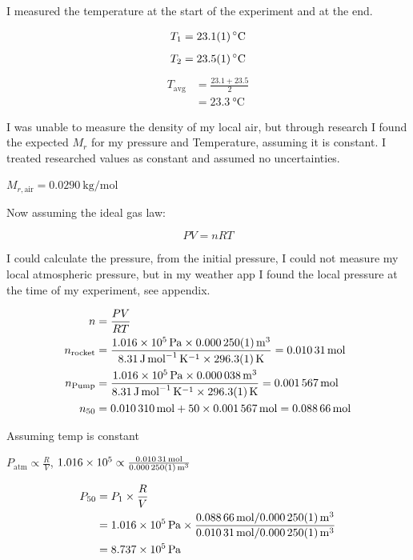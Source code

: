 \documentclass[12pt,a4paper]{article}
\begin{document}
I measured the temperature at the start of the experiment and at the end.

\begin{align}
T_1 &= \SI{23.1 \pm 0.1}{\celsius} \\
\end{align}
\begin{align}
T_2 &= \SI{23.5 \pm 0.1}{\celsius} \\
\end{align}
\begin{align} T_{\text{avg}} &= \frac{23.1 + 23.5}{2} \\
&= \SI{23.3}{\celsius}
\end{align}

I was unable to measure the density of my local air, but through research \cite{ref14} I found the expected $M_r$ for my pressure and Temperature, assuming it is constant. I treated researched values as constant and assumed no uncertainties.

$M_{r,\text{air}} = \SI{0.0290}{\kilo\gram\per\mol}$

Now assuming the ideal gas law:

\begin{equation}
PV = nRT
\end{equation}

I could calculate the pressure, from the initial pressure, I could not measure my local atmospheric pressure, but in my weather app I found the local pressure at the time of my experiment, see appendix.

\begin{align}
n &= \frac{PV}{RT} \\
n_{\text{rocket}} &= \frac{\SI{1.016e5}{\pascal} \times \SI{0.000250 \pm 0.000001}{\meter\cubed}}{\SI{8.31}{\joule\per\mol\per\kelvin} \times \SI{296.3 \pm 0.1}{\kelvin}} = \SI{0.01031}{\mol} \\
n_{\text{Pump}} &= \frac{\SI{1.016e5}{\pascal} \times \SI{0.000038}{\meter\cubed}}{\SI{8.31}{\joule\per\mol\per\kelvin} \times \SI{296.3 \pm 0.1}{\kelvin}} = \SI{0.001567}{\mol} \\
n_{50} &= \SI{0.010310}{\mol} + 50 \times \SI{0.001567}{\mol} = \SI{0.08866}{\mol}
\end{align}

Assuming temp is constant

$P_{\text{atm}} \propto \frac{R}{V}$, $\SI{1.016e5}{} \propto \frac{\SI{0.01031}{\mol}}{\SI{0.000250 \pm 0.000001}{\meter\cubed}}$

\begin{align}
P_{50} &= P_1 \times \frac{R}{V} \\
&= \SI{1.016e5}{\pascal} \times \frac{\SI{0.08866}{\mol} / \SI{0.000250 \pm 0.000001}{\meter\cubed}}{\SI{0.01031}{\mol} / \SI{0.000250 \pm 0.000001}{\meter\cubed}} \\
&= \SI{8.737e5}{\pascal}
\end{align}
\end{document}
